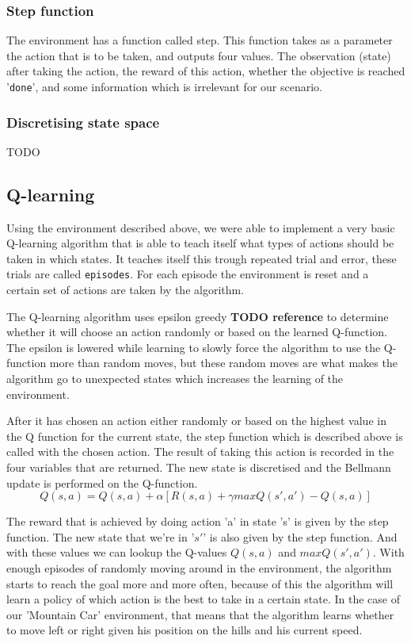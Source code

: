 \documentclass{article}
\begin{document}
\subsubsection{Step function}
The environment has a function called step. This function takes as a parameter the action that is to be taken, and outputs four values. The observation (state) after taking the action, the reward of this action, whether the objective is reached '\texttt{done}', and some information which is irrelevant for our scenario. 
\subsubsection{Discretising state space}
TODO 

\subsection{Q-learning}
Using the environment described above, we were able to implement a very basic Q-learning algorithm that is able to teach itself what types of actions should be taken in which states. 
It teaches itself this trough repeated trial and error, these trials are called \texttt{episodes}. For each episode the environment is reset and a certain set of actions are taken by the algorithm. 

The Q-learning algorithm uses epsilon greedy \textbf{TODO reference} to determine whether it will choose an action randomly or based on the learned Q-function. The epsilon is lowered while learning to slowly force the algorithm to use the Q-function more than random moves, but these random moves are what makes the algorithm go to unexpected states which increases the learning of the environment. 

After it has chosen an action either randomly or based on the highest value in the Q function for the current state, the step function which is described above is called with the chosen action. The result of taking this action is recorded in the four variables that are returned. The new state is discretised and the Bellmann update is performed on the Q-function. 
\begin{displaymath}
  Q(s, a) = Q(s,a) + \alpha[R(s,a) + \gamma max Q(s', a') - Q(s, a)]
\end{displaymath}

The reward that is achieved by doing action 'a' in state 's' is given by the step function. The new state that we're in '$s'$' is also given by the step function. And with these values we can lookup the Q-values $Q(s, a)$ and $max Q(s', a')$. 
With enough episodes of randomly moving around in the environment, the algorithm starts to reach the goal more and more often, because of this the algorithm will learn a policy of which action is the best to take in a certain state. In the case of our 'Mountain Car' environment, that means that the algorithm learns whether to move left or right given his position on the hills and his current speed.
\end{document}

